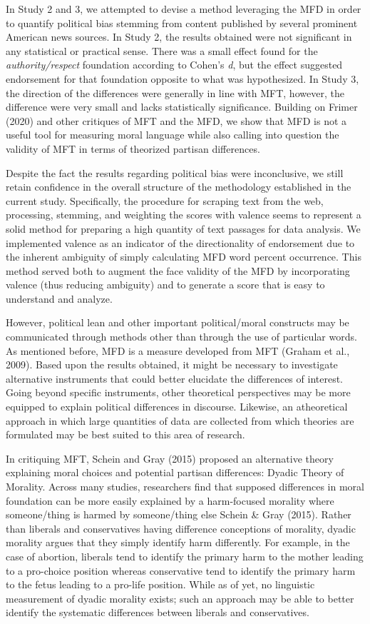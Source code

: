 \documentclass[
  man,floatsintext]{apa6}
\begin{document}
In Study 2 and 3, we attempted to
devise a method leveraging the MFD in order to quantify
political bias stemming from content published by several prominent
American news sources. In Study 2, the results obtained were not
significant in any statistical or practical sense. There was a small
effect found for the \emph{authority/respect} foundation according to Cohen's
\emph{d}, but the effect suggested endorsement for that foundation opposite
to what was hypothesized. In Study 3, the direction of the differences
were generally in line with MFT, however, the difference were very small
and lacks statistically significance. Building on Frimer (2020) and other
critiques of MFT and the MFD, we show that MFD is not a useful tool for
measuring moral language while also calling into question the validity
of MFT in terms of theorized partisan differences.

Despite the fact the results regarding political bias were inconclusive,
we still retain confidence in the overall structure of the methodology
established in the current study. Specifically, the procedure for
scraping text from the web, processing, stemming, and weighting the
scores with valence seems to represent a solid method for preparing a
high quantity of text passages for data analysis. We implemented valence
as an indicator of the directionality of endorsement due to the inherent
ambiguity of simply calculating MFD word percent occurrence. This method
served both to augment the face validity of the MFD by incorporating
valence (thus reducing ambiguity) and to generate a score that is easy
to understand and analyze.

However, political lean and other important political/moral constructs
may be communicated through methods other than through the use of
particular words. As mentioned before, MFD is a measure developed from
MFT (Graham et al., 2009). Based upon the results obtained, it might be
necessary to investigate alternative instruments that could better
elucidate the differences of interest. Going beyond specific
instruments, other theoretical perspectives may be more equipped to
explain political differences in discourse. Likewise, an atheoretical
approach in which large quantities of data are collected from which
theories are formulated may be best suited to this area of research.

In critiquing MFT, Schein and Gray (2015) proposed an alternative theory explaining
moral choices and potential partisan differences: Dyadic Theory of
Morality. Across many studies, researchers find that supposed
differences in moral foundation can be more easily explained by a
harm-focused morality where someone/thing is harmed by someone/thing
else Schein \& Gray (2015). Rather than liberals and conservatives
having difference conceptions of morality, dyadic morality argues that
they simply identify harm differently. For example, in the case of
abortion, liberals tend to identify the primary harm to the mother
leading to a pro-choice position whereas conservative tend to identify
the primary harm to the fetus leading to a pro-life position. While as
of yet, no linguistic measurement of dyadic morality exists; such an
approach may be able to better identify the systematic differences
between liberals and conservatives.
\end{document}
